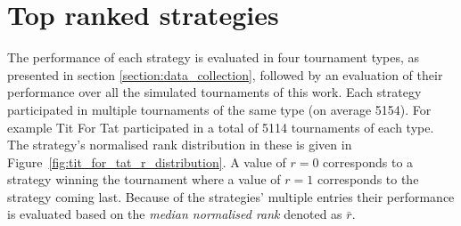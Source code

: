 \begin{table}[!htbp]
    \begin{center}
\end{center}
\caption{Output result of a single tournament.}\label{table:output_result}
\end{table}

\section{Top ranked strategies}\label{section:top_performances}

The performance of each strategy is evaluated in four tournament types, as
presented in section \ref{section:data_collection}, followed by an
evaluation of their performance over all the \numberofalltournaments simulated
tournaments of this work. Each strategy participated in multiple tournaments of
the same type (on average 5154). For example Tit For Tat participated in a
total of 5114 tournaments of each type. The strategy's normalised rank
distribution in these is given in Figure~\ref{fig:tit_for_tat_r_distribution}. A
value of \(r = 0\) corresponds to a strategy winning the tournament where a
value of \(r = 1\) corresponds to the strategy coming last. Because of the
strategies' multiple entries their performance is evaluated based on the
\textit{median normalised rank} denoted as \(\bar{r}\).

